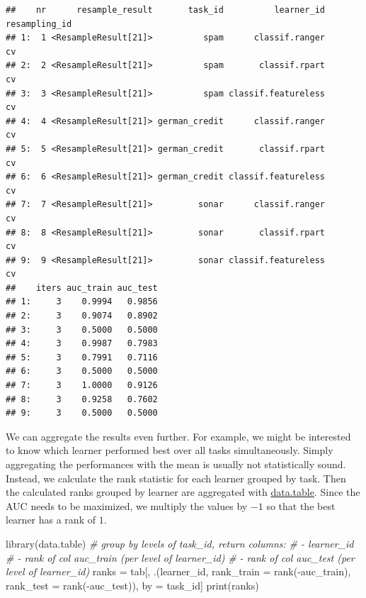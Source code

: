 \documentclass[
]{scrbook}
\newenvironment{Shaded}{\begin{snugshade}}{\end{snugshade}}
\newcommand{\AttributeTok}[1]{\textcolor[rgb]{0.77,0.63,0.00}{#1}}
\newcommand{\CommentTok}[1]{\textcolor[rgb]{0.56,0.35,0.01}{\textit{#1}}}
\newcommand{\FunctionTok}[1]{\textcolor[rgb]{0.00,0.00,0.00}{#1}}
\newcommand{\NormalTok}[1]{#1}
\newcommand{\OtherTok}[1]{\textcolor[rgb]{0.56,0.35,0.01}{#1}}
\newcommand{\SpecialCharTok}[1]{\textcolor[rgb]{0.00,0.00,0.00}{#1}}
\renewenvironment{Shaded} {\begin{snugshade}\small} {\end{snugshade}}
\begin{document}
\begin{verbatim}
##    nr      resample_result       task_id          learner_id resampling_id
## 1:  1 <ResampleResult[21]>          spam      classif.ranger            cv
## 2:  2 <ResampleResult[21]>          spam       classif.rpart            cv
## 3:  3 <ResampleResult[21]>          spam classif.featureless            cv
## 4:  4 <ResampleResult[21]> german_credit      classif.ranger            cv
## 5:  5 <ResampleResult[21]> german_credit       classif.rpart            cv
## 6:  6 <ResampleResult[21]> german_credit classif.featureless            cv
## 7:  7 <ResampleResult[21]>         sonar      classif.ranger            cv
## 8:  8 <ResampleResult[21]>         sonar       classif.rpart            cv
## 9:  9 <ResampleResult[21]>         sonar classif.featureless            cv
##    iters auc_train auc_test
## 1:     3    0.9994   0.9856
## 2:     3    0.9074   0.8902
## 3:     3    0.5000   0.5000
## 4:     3    0.9987   0.7983
## 5:     3    0.7991   0.7116
## 6:     3    0.5000   0.5000
## 7:     3    1.0000   0.9126
## 8:     3    0.9258   0.7602
## 9:     3    0.5000   0.5000
\end{verbatim}

We can aggregate the results even further.
For example, we might be interested to know which learner performed best over all tasks simultaneously.
Simply aggregating the performances with the mean is usually not statistically sound.
Instead, we calculate the rank statistic for each learner grouped by task.
Then the calculated ranks grouped by learner are aggregated with \href{https://cran.r-project.org/package=data.table}{data.table}.
Since the AUC needs to be maximized, we multiply the values by \(-1\) so that the best learner has a rank of \(1\).

\begin{Shaded}
\begin{Highlighting}[]
\FunctionTok{library}\NormalTok{(data.table)}
\CommentTok{\# group by levels of task\_id, return columns:}
\CommentTok{\# {-} learner\_id}
\CommentTok{\# {-} rank of col \textquotesingle{}{-}auc\_train\textquotesingle{} (per level of learner\_id)}
\CommentTok{\# {-} rank of col \textquotesingle{}{-}auc\_test\textquotesingle{} (per level of learner\_id)}
\NormalTok{ranks }\OtherTok{=}\NormalTok{ tab[, .(learner\_id, }\AttributeTok{rank\_train =} \FunctionTok{rank}\NormalTok{(}\SpecialCharTok{{-}}\NormalTok{auc\_train), }\AttributeTok{rank\_test =} \FunctionTok{rank}\NormalTok{(}\SpecialCharTok{{-}}\NormalTok{auc\_test)), by }\OtherTok{=}\NormalTok{ task\_id]}
\FunctionTok{print}\NormalTok{(ranks)}
\end{Highlighting}
\end{Shaded}
\end{document}
